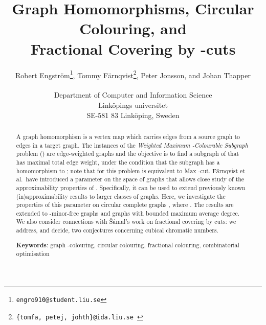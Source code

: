\documentclass[11pt,a4paper]{article}
\begin{document}
\newcommand{\pform}{{\rm Pr}}
\newcommand{\axform}{{\rm AX}}
\newcommand{\axset}{{\bf AX}}
\newcommand{\resdeduce}{\vdash_{\rm R}}
\newcommand{\resaxdeduce}{\vdash_{\rm R,A}}

\newcommand{\cmis}{{\em \#mis}}
\newcommand{\combine}{{\em comb}}

\newcommand{\xcsp}{{\sc X-Csp}}
\newcommand{\csp}{{\sc Csp}}

\newcommand{\cc}[1]{\textnormal{\textbf{#1}}} \newcommand{\opt}[0]{\textrm{{\sc opt}}}


\newcommand{\MC}{mc}
\newcommand{\Ha}{\textrm{\textit{H\aa}}}
\renewcommand{\atop}[2]{\genfrac{}{}{0pt}{}{#1}{#2}}
\newcommand{\GHAT}{{\cal G_\equiv}}
\newcommand{\HOMEQ}{\equiv}

\pagestyle{plain}

\author{Robert Engstr\"om\footnote{\tt{engro910@student.liu.se}}, Tommy F\"arnqvist\footnote{\tt{\{tomfa, petej, johth\}@ida.liu.se }}, Peter Jonsson\footnotemark[2],  and Johan Thapper\footnotemark[2]\\
\\
\small
Department of Computer and Information Science\\
\small
Link\"{o}pings universitet\\
\small
SE-581 83 Link\"{o}ping, Sweden\\}


\title{Graph Homomorphisms, Circular Colouring, and \\ Fractional Covering by -cuts}

\date{}
\maketitle

   

\begin{abstract}
A graph homomorphism is a vertex map which carries edges from a source 
graph to edges in a
target graph. The instances of the \emph{Weighted Maximum 
-Colourable Subgraph} problem () are
edge-weighted graphs  and
the objective is to find a subgraph of  that has maximal total edge
weight, under 
the condition that the subgraph has a homomorphism to ; note that for
 this 
problem is equivalent to {\sc Max -cut}. F\"arnqvist et al.\ have
introduced a parameter on the space of graphs that allows close study of
the approximability properties of . Specifically, it can be
used to extend previously known (in)approximability results to larger
classes of graphs. Here, we investigate the properties of this parameter
on circular complete graphs , where . The
results are extended to -minor-free graphs and graphs with bounded
maximum average degree. We also consider connections with
\v{S}\'{a}mal's work on fractional covering by cuts: we address,
and decide, two conjectures concerning cubical chromatic numbers.

\noindent
{\bf Keywords}: graph -colouring, circular colouring, fractional
colouring, combinatorial optimisation
\end{abstract}
\end{document}
